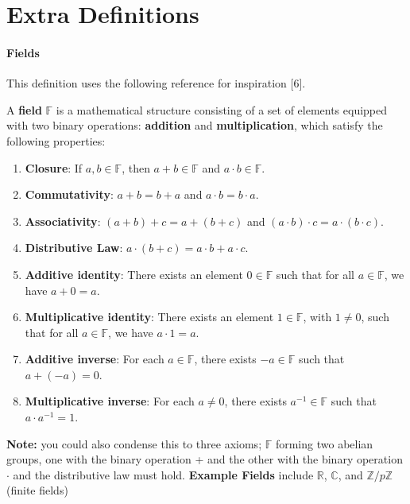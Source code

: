 \chapter{Extra Definitions}
\label{appendix:A}

\subsubsection{Fields}
\noindent This definition uses the following reference for inspiration [6].

\noindent A \textbf{field} \( \mathbb{F} \) is a mathematical structure consisting of a set of elements equipped with two binary operations: \textbf{addition} and \textbf{multiplication}, which satisfy the following properties:

\begin{enumerate}
    \item \textbf{Closure}: If \( a, b \in \mathbb{F} \), then \( a + b \in \mathbb{F} \) and \( a \cdot b \in \mathbb{F} \).
    \item \textbf{Commutativity}: \( a + b = b + a \) and \( a \cdot b = b \cdot a \).
    \item \textbf{Associativity}: \( (a + b) + c = a + (b + c) \) and \( (a \cdot b) \cdot c = a \cdot (b \cdot c) \).
    \item \textbf{Distributive Law}: \( a \cdot (b + c) = a \cdot b + a \cdot c \).
    \item \textbf{Additive identity}: There exists an element \( 0 \in \mathbb{F} \) such that for all \( a \in \mathbb{F} \), we have \( a + 0 = a \).
    \item \textbf{Multiplicative identity}: There exists an element \( 1 \in \mathbb{F} \), with \( 1 \neq 0 \), such that for all \( a \in \mathbb{F} \), we have \( a \cdot 1 = a \).
    \item \textbf{Additive inverse}: For each \( a \in \mathbb{F} \), there exists \( -a \in \mathbb{F} \) such that \( a + (-a) = 0 \).
    \item \textbf{Multiplicative inverse}: For each \( a \neq 0 \), there exists \( a^{-1} \in \mathbb{F} \) such that \( a \cdot a^{-1} = 1 \).
\end{enumerate}

\noindent \textbf{Note:} you could also condense this to three axioms; \( \mathbb{F} \) forming two abelian groups, one with the binary operation + and the other with the binary operation \(\cdot\) and the distributive law must hold.
\noindent \textbf{Example Fields} include \( \mathbb{R} \), \( \mathbb{C} \), and \( \mathbb{Z}/p\mathbb{Z} \) (finite fields)\\


